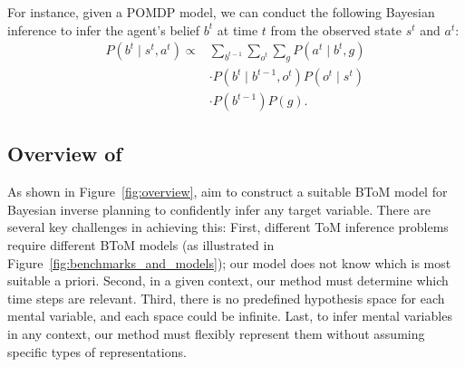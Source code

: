 For instance, given a POMDP model, we can conduct the following Bayesian inference to infer the agent's belief $b^t$ at time $t$ from the observed state $s^t$ and $a^t$:
\begin{equation}
\begin{aligned}
P(b^t \mid s^{t}, a^{t})
 \propto & \sum_{b^{t-1}} \sum_{o^t} \sum_g P(a^t \mid b^t, g) \\ 
& \cdot P(b^t \mid b^{t-1}, o^t) P(o^t \mid s^t) \\
& \cdot P(b^{t-1}) P(g).
\end{aligned}
\end{equation}


\subsection{Overview of \ours}

As shown in Figure~\ref{fig:overview}, \ours aim to construct a suitable BToM model for Bayesian inverse planning to confidently infer any target variable. There are several key challenges in achieving this: First, different ToM inference problems require different BToM models (as illustrated in Figure~\ref{fig:benchmarks_and_models}); our model does not know which is most suitable a priori. Second, in a given context, our method must determine which time steps are relevant. Third, there is no predefined hypothesis space for each mental variable, and each space could be infinite. Last, to infer mental variables in any context, our method must flexibly represent them without assuming specific types of representations.


